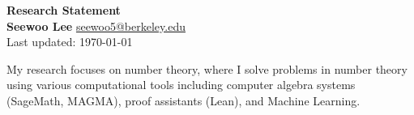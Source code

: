\documentclass[letterpaper, 10pt]{article}
\begin{document}
\noindent \textbf{Research Statement} \\
\textbf{Seewoo Lee} \href{mailto:seewoo5@berkeley.edu}{seewoo5@berkeley.edu} \\
Last updated: \today
\bigskip





My research focuses on number theory, where I solve problems in number theory using various computational tools including computer algebra systems (SageMath, MAGMA), proof assistants (Lean), and Machine Learning.





\end{document}
